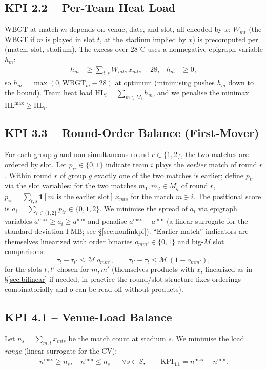 \documentclass[12pt, letterpaper]{article}
\begin{document}
\subsection{KPI 2.2 -- Per-Team Heat Load}
$\mathrm{WBGT}$ at match $m$ depends on venue, date, and slot, all encoded
by $x$; $W_{mt}$ (the WBGT if $m$ is played in slot $t$, at the stadium
implied by $x$) is precomputed per (match, slot, stadium). The excess
over $28^\circ$C uses a nonnegative epigraph variable $h_m$:
\begin{align}
h_m &\ge \sum_{t,s} W_{mts}\,x_{mts} - 28, & h_m &\ge 0,
\end{align}
so $h_m=\max(0,\mathrm{WBGT}_m-28)$ at optimum (minimising pushes $h_m$
down to the bound). Team heat load $\mathrm{HL}_i=\sum_{m\in M_i} h_m$,
and we penalise the minimax $\mathrm{HL}^{\max}\ge\mathrm{HL}_i$.

\subsection{KPI 3.3 -- Round-Order Balance (First-Mover)}
For each group $g$ and non-simultaneous round $r\in\{1,2\}$, the two
matches are ordered by slot. Let $p_{ir}\in\{0,1\}$ indicate team $i$
plays the \emph{earlier} match of round $r$. Within round $r$ of group
$g$ exactly one of the two matches is earlier; define $p_{ir}$ via the
slot variables: for the two matches $m_1,m_2\in M_g$ of round $r$,
$p_{ir}=\sum_{t,s}\mathbf 1[\text{$m$ is the earlier slot}]\,x_{mts}$ for
the match $m\ni i$. The positional score is $a_i=\sum_{r\in\{1,2\}}
p_{ir}\in\{0,1,2\}$. We minimise the spread of $a_i$ via epigraph
variables $a^{\max}\ge a_i\ge a^{\min}$ and penalise $a^{\max}-a^{\min}$
(a linear surrogate for the standard deviation $\mathrm{FMB}$; see
\S\ref{sec:nonlinkpi}). ``Earlier match'' indicators are themselves
linearized with order binaries $o_{m m'}\in\{0,1\}$ and big-$M$ slot
comparisons:
\begin{equation}
\tau_{t}-\tau_{t'} \le \mathcal M\,o_{mm'},\qquad
\tau_{t'}-\tau_{t} \le \mathcal M\,(1-o_{mm'}),
\end{equation}
for the slots $t,t'$ chosen for $m,m'$ (themselves products with $x$,
linearized as in \S\ref{sec:bilinear} if needed; in practice the
round/slot structure fixes orderings combinatorially and $o$ can be read
off without products).

\subsection{KPI 4.1 -- Venue-Load Balance}
Let $n_s=\sum_{m,t} x_{mts}$ be the match count at stadium $s$. We
minimise the load \emph{range} (linear surrogate for the CV):
\begin{align}
n^{\max}\ge n_s,\quad n^{\min}\le n_s &&\forall s\in S,\qquad
\mathrm{KPI}_{4.1}=n^{\max}-n^{\min}.
\end{align}
\end{document}
